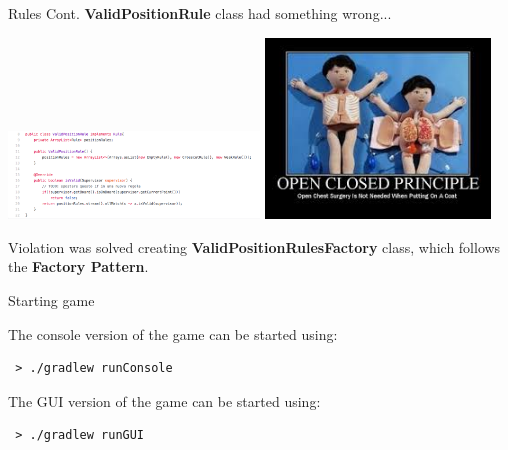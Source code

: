 \documentclass{beamer}
\begin{document}
     \begin{frame} {Rules Cont.}
     \textbf{ValidPositionRule} class had something wrong...

     \vspace{1em}

     {\includegraphics[width=0.5\textwidth]{img/validpositionrule.png}}
        \pause
     {\includegraphics[width=0.45\textwidth]{img/openclosedprinciple.jpeg}}
     \pause

     \vspace{1em}

     Violation was solved creating \textbf{ValidPositionRulesFactory} class, which follows the \textbf{Factory Pattern}.

     \end{frame}





  \begin{frame}[fragile]{Starting game}

    The console version of the game can be started using:

    \begin{lstlisting}
 > ./gradlew runConsole
    \end{lstlisting}

    \vspace{3em}

    The GUI version of the game can be started using:

    \begin{lstlisting} 
 > ./gradlew runGUI
    \end{lstlisting}

  \end{frame}
\end{document}
